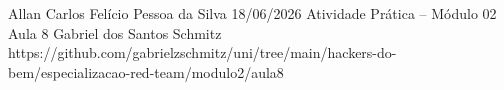 \documentclass{article}
\begin{document}
{Allan Carlos Felício Pessoa da Silva}
{18/06/2026}
{Atividade Prática -- Módulo 02}
{Aula 8}
{Gabriel dos Santos Schmitz}
{https://github.com/gabrielzschmitz/uni/tree/main/hackers-do-bem/especializacao-red-team/modulo2/aula8}





\newpage
\printbibliography[title=Referências]
\end{document}
